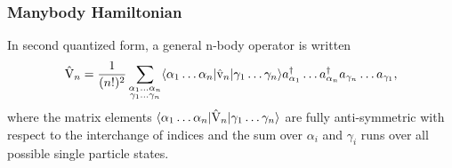 \begin{frame}[fragile]
    \frametitle{Manybody Hamiltonian}

    In second quantized form, a general n-body operator is written
    \begin{equation*}
        \hat{\mathrm{V}}_n = \frac{1}{(n!)^2} \sum_{\substack{
            \alpha_1 \ldots \alpha_n \\
            \gamma_1 \ldots \gamma_n}}
        \langle \alpha_1 \ldots \alpha_n | \hat{\mathrm{v}}_n |\gamma_1 \ldots \gamma_n\rangle
        a^\dagger_{\alpha_1} \ldots a^\dagger_{\alpha_n}
        a_{\gamma_n} \ldots a_{\gamma_1},
    \end{equation*}
    where the matrix elements $\langle \alpha_1 \ldots \alpha_n | \hat{\mathrm{V}}_n |\gamma_1 \ldots \gamma_n\rangle$ are fully anti-symmetric with respect to the interchange of indices and the sum over $\alpha_i$ and $\gamma_i$ runs over all possible single particle states.
\end{frame}

